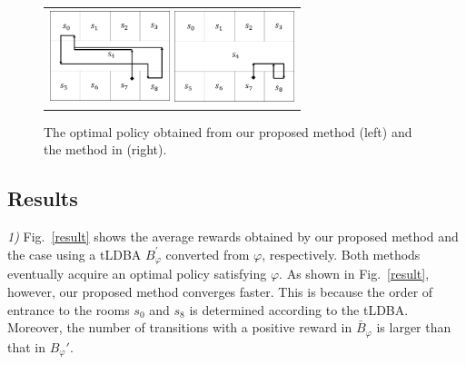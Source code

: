 \begin{figure}[tbp]
	\centering
	\begin{tabular}{c}

		\begin{minipage}{0.499\hsize}
		\centering
			\includegraphics[bb=0 0 341 256, height = 2.7cm,
			width=3.5cm]{proposed_policy.png}
		\end{minipage}

		\begin{minipage}{0.499\hsize}
			\centering
			\includegraphics[bb=0 0 341 257, height = 2.7cm,
			width=3.5cm]{Abate_policy.png}
		\end{minipage}
	\end{tabular}

	\caption{The optimal policy obtained from our proposed method (left) and the method in \cite{HAK2019, HKAKPL2019} (right).}
	\label{optimal}
\end{figure}

\subsection*{Results}
\textit{1) }
Fig.\ \ref{result} shows the average rewards obtained by our proposed method and the case using a tLDBA $B^{\prime}_{\varphi}$ converted from $\varphi$, respectively.
Both methods eventually acquire an optimal policy satisfying $\varphi$. As shown in Fig.\ \ref{result}, however, our proposed method converges faster. This is because the order of entrance to the rooms $s_0$ and $s_8$ is determined according to the tLDBA.
Moreover, the number of transitions with a positive reward in $\bar{B}_\varphi$ is larger than that in $B_\varphi'$.

